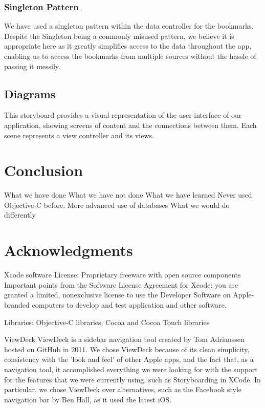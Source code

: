 \documentclass[a4wide, 10pt]{article}
\begin{document}
\subsubsection{Singleton Pattern}
We have used a singleton pattern within the data controller for the bookmarks. Despite the Singleton being a commonly misused pattern, we believe it is appropriate here as it greatly simplifies access to the data throughout the app, enabling us to access the bookmarks from multiple sources without the hassle of passing it messily. 

\subsection{Diagrams}
This storyboard provides a visual representation of the user interface of our application, showing screens of content and the connections between them. Each scene represents a view controller and its views. 

\section{Conclusion}
	What we have done
	What we have not done
	What we have learned
		Never used Objective-C before.
		More advanced use of databases
	What we would do differently
	
\section{Acknowledgments}

Xcode software
License: Proprietary freeware with open source components
Important points from the Software License Agreement for Xcode:
you are granted a limited, nonexclusive license to use the Developer Software on Apple-branded computers to develop and test application and other software.

Libraries: Objective-C libraries, Cocoa and Cocoa Touch libraries

ViewDeck
ViewDeck is a sidebar navigation tool created by Tom Adrianssen hosted on GitHub in 2011. We chose ViewDeck because of its clean simplicity, consistency with the 'look and feel' of other Apple apps, and the fact that, as a navigation tool, it accomplished everything we were looking for with the support for the features that we were currently using, such as Storyboarding in XCode. In particular, we chose ViewDeck over alternatives, such as the Facebook style navigation bar by Ben Hall, as it used the latest iOS.
\end{document}
